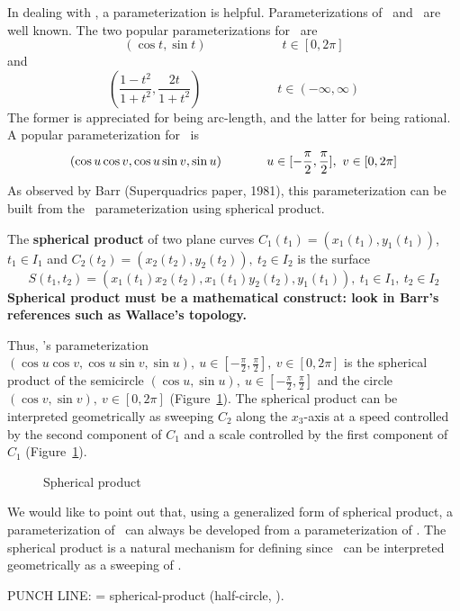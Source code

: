 In dealing with , a parameterization is helpful.
Parameterizations of \ and \ are well known.
The two popular parameterizations for \ are
\[
	(\cos t, \sin t) \hspace{1in}	t \in [0,2\pi]
\]
and 
\[
	(\frac{1-t^2}{1+t^2}, \frac{2t}{1+t^2}) \hspace{1in}
		 t \in (-\infty,\infty)
\]
The former is appreciated for being arc-length, 
and the latter for being rational.
A popular parameterization for \ is
\[
	(\cos u \cos v, \cos u \sin v, \sin u) \hspace{.5in} 
	u \in [-\frac{\pi}{2}, \frac{\pi}{2}],\ v \in [0,2\pi]
\]
As observed by Barr (Superquadrics paper, 1981), this parameterization can be built
from the \ parameterization using spherical product.
%
\begin{defn2}
The {\bf spherical product} of two plane curves 
$C_1(t_1) = (x_1(t_1), y_1(t_1))$, $t_1 \in I_1$ and 
$C_2(t_2) = (x_2(t_2), y_2(t_2)),\ t_2 \in I_2$ is the surface
\[
S(t_1,t_2) = (x_1(t_1) x_2(t_2), x_1(t_1) y_2(t_2), y_1(t_1)),\ 
t_1 \in I_1,\ t_2 \in I_2
\]
{\bf Spherical product must be a mathematical construct: look in Barr's references
such as Wallace's topology.}
\end{defn2}
%
Thus, 's parameterization $(\cos u \cos v, \cos u \sin v, \sin u),\ 
u \in [-\frac{\pi}{2}, \frac{\pi}{2}],\ v \in [0,2\pi]$
is the spherical product of the semicircle
$(\cos u, \sin u),\ u \in [-\frac{\pi}{2}, \frac{\pi}{2}]$ and the circle
$(\cos v, \sin v),\ v \in [0,2\pi]$ (Figure~\ref{fig:sphericalproduct}).
The spherical product can be interpreted geometrically as 
sweeping $C_2$ along the $x_3$-axis 
at a speed controlled by the second component of $C_1$ 
and a scale controlled by the first component of $C_1$ (Figure~\ref{fig:sphericalproduct}).

\begin{figure}
\label{fig:sphericalproduct}
\vspace{2in}
\caption{Spherical product}
\end{figure}

We would like to point out that, using a generalized form of spherical
product, a parameterization of \ 
can always be developed from a parameterization of .
The spherical product is a natural mechanism for defining 
since \Sn{n}\ can be interpreted geometrically as a sweeping of .

PUNCH LINE: \Sn{n} = spherical-product (half-circle, \Sn{n-1}).

